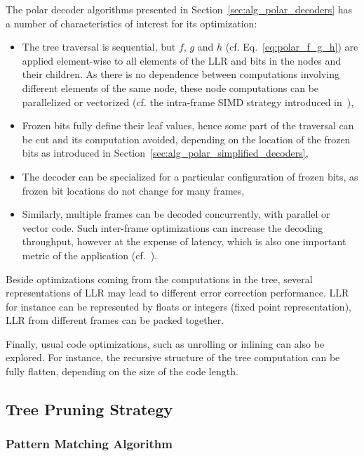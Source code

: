 The polar decoder algorithms presented in Section~\ref{sec:alg_polar_decoders}
has a number of characteristics of interest for its optimization:
\begin{itemize}
  \item The tree traversal is sequential, but $f$, $g$ and $h$ (cf.
    Eq.~\ref{eq:polar_f_g_h}) are applied element-wise to all elements of the
    LLR and bits in the nodes and their children. As there is no dependence
    between computations involving different elements of the same node, these
    node computations can be parallelized or vectorized (cf. the
    intra-frame SIMD strategy introduced in~\cite{Giard2014}),
  \item Frozen bits fully define their leaf values, hence some part of the
    traversal can be cut and its computation avoided, depending on the
    location of the frozen bits as introduced in
    Section~\ref{sec:alg_polar_simplified_decoders},
  \item The decoder can be specialized for a particular configuration of frozen
    bits, as frozen bit locations do not change for many frames,
  \item Similarly, multiple frames can be decoded concurrently, with parallel or
    vector code. Such inter-frame optimizations can increase the decoding
    throughput, however at the expense of latency, which is also one important
    metric of the application (cf.~\cite{LeGal2015a}).
\end{itemize}

Beside optimizations coming from the computations in the tree, several
representations of LLR may lead to different error correction performance. LLR
for instance can be represented by floats or integers (fixed point
representation), LLR from different frames can be packed together.

Finally, usual code optimizations, such as unrolling or inlining can also be
explored. For instance, the recursive structure of the tree computation can be
fully flatten, depending on the size of the code length.

\subsection{Tree Pruning Strategy}
\label{sec:opt_tree_pruning}

\subsubsection{Pattern Matching Algorithm}
\label{sec:opt_pattern_matching}

